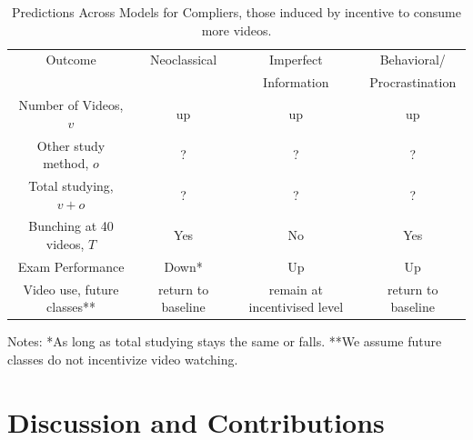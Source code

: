 \documentclass[12pt]{article}
\begin{document}
\begin{table}
	\caption{Predictions Across Models for Compliers, those induced by incentive to consume more videos.}
	\centering
	\begin{tabular}{ c|c|c|c }
		Outcome &  Neoclassical & Imperfect& Behavioral/ \\
		& & Information & Procrastination\\
		\hline
		Number of Videos, $v$ & up & up & up \\
		Other study method, $o$ & ? & ? & ?\\
		Total studying, $v+o$ & ? & ? & ? \\
		Bunching at 40 videos, $T$  & Yes & No & Yes \\
		Exam Performance & Down* & Up & Up\\
		Video use, future classes** & return to baseline & remain at incentivised level & return to baseline \\
		\hline
	\end{tabular}
	Notes: *As long as total studying stays the same or falls.  **We assume future classes do not incentivize video watching.
	\label{modelpredictions}
	
\end{table}



\section{Discussion and Contributions} \label{discussion}
\end{document}
